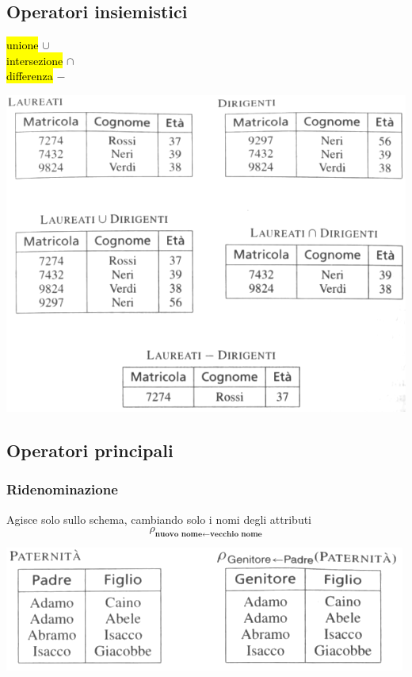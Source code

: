 \documentclass[a4paper]{article}
\begin{document}
\subsection{Operatori insiemistici}
\hl{unione} $\cup$ \\
\hl{intersezione} $\cap$\\
\hl{differenza} $-$
\begin{center}
      \includegraphics[scale=0.45]{img/ar1.png}
\end{center}

\subsection{Operatori principali}
\subsubsection{Ridenominazione}
Agisce solo sullo schema, cambiando solo i nomi degli attributi
\[\rho_{\textbf{nuovo nome}\leftarrow \textbf{vecchio nome}}\]
\begin{center}
      \includegraphics[scale=0.45]{img/ar2.png}
\end{center}
\end{document}
